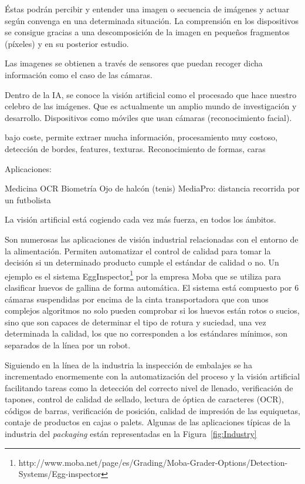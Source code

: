  Éstas podrán percibir y entender una imagen o secuencia de imágenes y actuar según convenga en una determinada situación. La comprensión en los dispositivos se consigue gracias a una descomposición de la imagen en pequeños fragmentos (píxeles) y en su posterior estudio.


Las imagenes se obtienen a través de sensores que puedan recoger dicha información como el caso de las cámaras.

Dentro de la IA, se conoce la visión artificial como el procesado que hace nuestro celebro de las imágenes. Que es actualmente un amplio mundo de investigación y desarrollo. Dispositivos como móviles que usan cámaras (reconocimiento facial).

bajo coste, permite extraer mucha información, procesamiento muy costoso, detección de bordes, features, texturas. Reconocimiento de formas, caras

Aplicaciones:

Medicina
OCR
Biometría
Ojo de halcón (tenis)
MediaPro: distancia recorrida por un futbolista

La visión artificial está cogiendo cada vez más fuerza, en todos los ámbitos.

Son numerosas las aplicaciones de visión industrial relacionadas con el entorno de la alimentación. Permiten automatizar el control de calidad para tomar la decisión si un determinado producto cumple el estándar de calidad o no. Un ejemplo es el sistema EggInspector\footnote{http://www.moba.net/page/es/Grading/Moba-Grader-Options/Detection-Systems/Egg-inspector} por la empresa Moba que se utiliza para clasificar huevos de gallina de forma automática. El sistema está compuesto por 6 cámaras suspendidas por encima de la cinta transportadora que con unos complejos algoritmos no solo pueden comprobar si los huevos están rotos o sucios, sino que son capaces de determinar el tipo de rotura y suciedad, una vez determinada la calidad, los que no corresponden a los estándares mínimos, son separados de la línea por un robot.

Siguiendo en la línea de la industria la inspección de embalajes se ha incrementado enormemente con la automatización del proceso y la visión artificial facilitando tareas como la detección del correcto nivel de llenado, verificación de tapones, control de calidad de sellado, lectura de óptica de caracteres (OCR), códigos de barras, verificación de posición, calidad de impresión de las equiquetas, contaje de productos en cajas o palets. Algunas de las aplicaciones típicas de la industria del \textit{packaging} están representadas en la Figura~\ref{fig:Industry}

